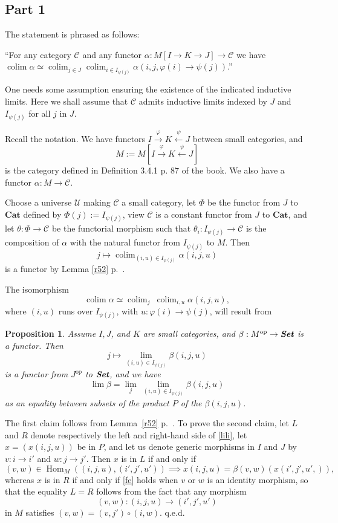 \documentclass[12pt]{article}
\newtheorem{prop}[thm]{Proposition}
\theoremstyle{remark}%
\newcommand{\n}{\noindent}
\newcommand{\C}{\mathcal C}
\newcommand{\U}{\mathcal U}
\newcommand{\Cat}{\textbf{Cat}}
\newcommand{\p}{\varphi}
\newcommand{\be}{\begin{equation}}
\newcommand{\ee}{\end{equation}}
\DeclareMathOperator*{\co}{colim}
\DeclareMathOperator{\h}{Hom}
\DeclareMathOperator{\op}{op}
\begin{document}
\subsection{Part 1} 
% 
The statement is phrased as follows: 

``For any category $\C$ and any functor $\alpha:M[I\to K\rightarrow J]\to\C$ we have $\co\alpha\simeq\co_{j\in J}\co_{i\in I_{\psi(j)}}\alpha(i,j,\p(i)\to\psi(j))$.'' 

One needs some assumption ensuring the existence of the indicated inductive limits. Here we shall assume that $\C$ admits inductive limits indexed by $J$ and $I_{\psi(j)}$ for all $j$ in $J$. 

Recall the notation. We have functors $I\xrightarrow\p K\xleftarrow\psi J$ between small categories, and 
$$
M:=M[I\xrightarrow\p K\xleftarrow\psi J] 
$$ 
is the category defined in Definition 3.4.1 p. 87 of the book. We also have a functor $\alpha:M\to\C$. 

Choose a universe $\U$ making $\C$ a small category, let $\Phi$ be the functor from $J$ to $\Cat$ defined by $\Phi(j):=I_{\psi(j)}$, view $\C$ is a constant functor from $J$ to $\Cat$, and let $\theta:\Phi\to\C$ be the functorial morphism such that $\theta_i:I_{\psi(j)}\to\C$ is the composition of $\alpha$ with the natural functor from $I_{\psi(j)}$ to $M$. Then 
$$
j\mapsto\co_{(i,u)\in I_{\psi(j)}}\alpha(i,j,u) 
$$ 
is a functor by Lemma \ref{r52} p.~\pageref{r52}. 

The isomorphism 
% 
\be\label{coco2}
\co\alpha\simeq\co_j\ \co_{i,u}\alpha(i,j,u),
\ee 
% 
where $(i,u)$ runs over $I_{\psi(j)}$, with $u:\p(i)\to\psi(j)$, will result from 
% 
\begin{prop}%
% 
Assume $I,J$, and $K$ are small categories, and $\beta:M^{\op}\to\textbf{\em Set}$ is a functor. Then 
$$
j\mapsto\lim_{(i,u)\in I_{\psi(j)}}\beta(i,j,u)
$$ 
is a functor from $J^{\op}$ to $\textbf{\em Set}$, and we have  
% 
\be\label{lili} 
\lim\beta=\lim_j\ \lim_{(i,u)\in I_{\psi(j)}}\beta(i,j,u) 
\ee 
% 
as an equality between subsets of the product $P$ of the $\beta(i,j,u)$. 
% 
\end{prop} 
%
\n{\em Proof.} The first claim follows from Lemma~\ref{r52} p.~\pageref{r52}. To prove the second claim, let $L$ and $R$ denote respectively the left and right-hand side of \eqref{lili}, let $x=(x(i,j,u))$ be in $P$, and let us denote generic morphisms in $I$ and $J$ by $v:i\to i'$ and $w:j\to j'$. Then $x$ is in $L$ if and only if 
% 
\be\label{fe} 
(v,w)\in\h_M((i,j,u),(i',j',u'))\implies x(i,j,u)=\beta(v,w)(x(i',j',u',)), 
\ee 
% 
whereas $x$ is in $R$ if and only if \eqref{fe} holds when $v$ or $w$ is an identity morphism, so that the equality $L=R$ follows from the fact that any morphism 
$$
(v,w):(i,j,u)\to(i',j',u')
$$ 
in $M$ satisfies $(v,w)=(v,j')\circ(i,w)$. q.e.d. 
\end{document}
